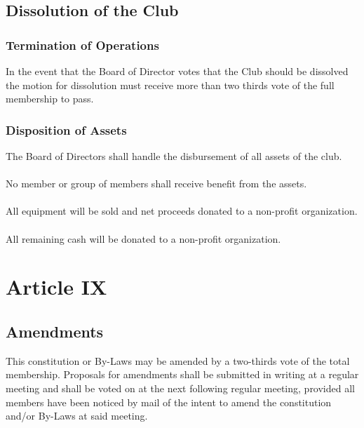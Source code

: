 \documentclass[english,12pt,letterpaper]{article}
\begin{document}
	\subsection*{Dissolution of the Club}
	\subsubsection*{Termination of Operations}
	In the event that the Board of Director votes that the Club should be dissolved the motion for dissolution must receive more than two thirds vote of the full membership to pass.
	\subsubsection*{Disposition of Assets}
	The Board of Directors shall handle the disbursement of all assets of the club. \\
	\\
	No member or group of members shall receive benefit from the assets. \\
	\\
	All equipment will be sold and net proceeds donated to a non-profit organization. \\
	\\
	All remaining cash will be donated to a non-profit organization.
	\section*{Article IX}
	\subsection*{Amendments}
	This constitution or By-Laws may be amended by a two-thirds vote of the total membership. Proposals for amendments shall be submitted in writing at a regular meeting and shall be voted on at the next following regular meeting, provided all members have been noticed by mail of the intent to amend the constitution and/or By-Laws at said meeting.
\end{document}
